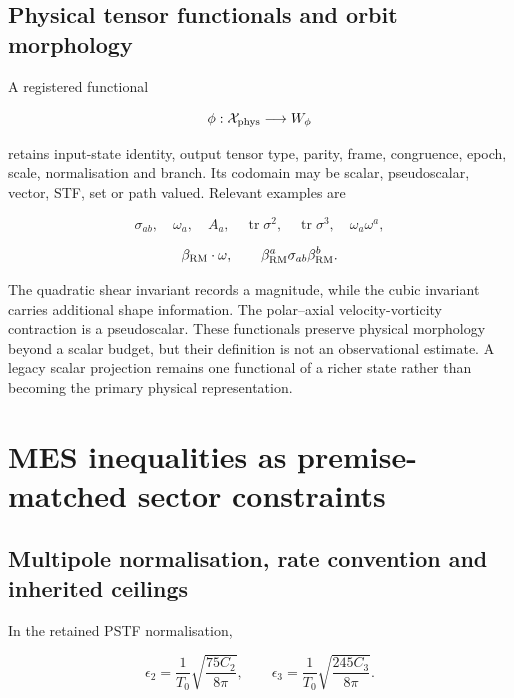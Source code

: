 \documentclass[
  11pt,
  a4paper]{article}
\begin{document}
\hypertarget{physical-tensor-functionals-and-orbit-morphology}{%
\subsection{Physical tensor functionals and orbit morphology}\label{physical-tensor-functionals-and-orbit-morphology}}

A registered functional

\[
\phi:\mathcal X_{\rm phys}\longrightarrow W_\phi
\]

retains input-state identity, output tensor type, parity, frame, congruence, epoch, scale, normalisation and branch. Its codomain may be scalar, pseudoscalar, vector, STF, set or path valued. Relevant examples are

\[
\sigma_{ab},\quad\omega_a,\quad A_a,
\quad\operatorname{tr}\sigma^2,
\quad\operatorname{tr}\sigma^3,
\quad\omega_a\omega^a,
\]

\[
\beta_{\rm RM}\cdot\omega,
\qquad\beta_{\rm RM}^{a}\sigma_{ab}\beta_{\rm RM}^{b}.
\]

The quadratic shear invariant records a magnitude, while the cubic invariant carries additional shape information. The polar--axial velocity-vorticity contraction is a pseudoscalar. These functionals preserve physical morphology beyond a scalar budget, but their definition is not an observational estimate. A legacy scalar projection remains one functional of a richer state rather than becoming the primary physical representation.

\hypertarget{mes-inequalities-as-premise-matched-sector-constraints}{%
\section{MES inequalities as premise-matched sector constraints}\label{mes-inequalities-as-premise-matched-sector-constraints}}

\hypertarget{multipole-normalisation-rate-convention-and-inherited-ceilings}{%
\subsection{Multipole normalisation, rate convention and inherited ceilings}\label{multipole-normalisation-rate-convention-and-inherited-ceilings}}

In the retained PSTF normalisation,

\[
\epsilon_2=\frac1{T_0}\sqrt{\frac{75C_2}{8\pi}},
\qquad
\epsilon_3=\frac1{T_0}\sqrt{\frac{245C_3}{8\pi}}.
\]
\end{document}
